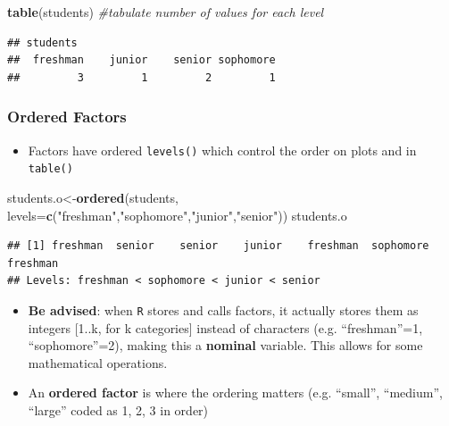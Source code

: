 \documentclass[]{book}
\newenvironment{Shaded}{\begin{snugshade}}{\end{snugshade}}
\newcommand{\KeywordTok}[1]{\textcolor[rgb]{0.13,0.29,0.53}{\textbf{#1}}}
\newcommand{\DataTypeTok}[1]{\textcolor[rgb]{0.13,0.29,0.53}{#1}}
\newcommand{\StringTok}[1]{\textcolor[rgb]{0.31,0.60,0.02}{#1}}
\newcommand{\CommentTok}[1]{\textcolor[rgb]{0.56,0.35,0.01}{\textit{#1}}}
\newcommand{\NormalTok}[1]{#1}
\providecommand{\tightlist}{%
  \setlength{\itemsep}{0pt}\setlength{\parskip}{0pt}}
\theoremstyle{definition}
\theoremstyle{definition}
\theoremstyle{definition}
\theoremstyle{remark}
\begin{document}
\begin{Shaded}
\begin{Highlighting}[]
\KeywordTok{table}\NormalTok{(students) }\CommentTok{#tabulate number of values for each level }
\end{Highlighting}
\end{Shaded}

\begin{verbatim}
## students
##  freshman    junior    senior sophomore 
##         3         1         2         1
\end{verbatim}

\subsubsection{Ordered Factors}\label{ordered-factors}

\begin{itemize}
\tightlist
\item
  Factors have ordered \texttt{levels()} which control the order on
  plots and in \texttt{table()}
\end{itemize}

\begin{Shaded}
\begin{Highlighting}[]
\NormalTok{students.o<-}\KeywordTok{ordered}\NormalTok{(students, }\DataTypeTok{levels=}\KeywordTok{c}\NormalTok{(}\StringTok{"freshman"}\NormalTok{,}\StringTok{"sophomore"}\NormalTok{,}\StringTok{"junior"}\NormalTok{,}\StringTok{"senior"}\NormalTok{))}
\NormalTok{students.o}
\end{Highlighting}
\end{Shaded}

\begin{verbatim}
## [1] freshman  senior    senior    junior    freshman  sophomore freshman 
## Levels: freshman < sophomore < junior < senior
\end{verbatim}

\begin{itemize}
\tightlist
\item
  \textbf{Be advised}: when \texttt{R} stores and calls factors, it
  actually stores them as integers {[}1..k, for k categories{]} instead
  of characters (e.g. ``freshman''=1, ``sophomore''=2), making this a
  \textbf{nominal} variable. This allows for some mathematical
  operations.
\item
  An \textbf{ordered factor} is where the ordering matters (e.g.
  ``small'', ``medium'', ``large'' coded as 1, 2, 3 in order)
\end{itemize}
\end{document}
